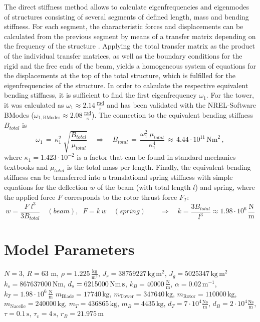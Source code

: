 \documentclass[a4paper]{article}
\newcommand{\rads}{\frac{\text{rad}}{\text{s}}}
\begin{document}
The direct stiffness method allows to calculate eigenfrequencies and eigenmodes of structures consisting of several segments of defined length, mass and bending stiffness. For each segment, the characteristic forces and displacements can be calculated from the previous segment by means of a transfer matrix depending on the frequency of the structure \cite{GaschKnothe2}. Applying the total transfer matrix as the product of the individual transfer matrices, as well as the boundary conditions for the rigid and the free ends of the beam, yields a homogeneous system of equations for the displacements at the top of the total structure, which is fulfilled for the eigenfrequencies of the structure.
In order to calculate the respective equivalent bending stiffness, it is sufficient to find the first eigenfrequency $\omega_1$. For the tower, it was calculated as $\omega_1 \approx 2.14 \, \rads$ and has been validated with the NREL-Software BModes \cite{BModes} ($\omega_{1,\text{BModes}} \approx 2.08 \, \rads $). The connection to the equivalent bending stiffness $B_{total}$ is
\begin{equation}
\omega_1 \, = \, \kappa_1^2 \; \sqrt{\frac{B_{total}}{\mu_{total}}} \quad \Rightarrow \quad B_{total} \,
			= \, \frac{\omega_1^2 \;  \mu_{total}}{\kappa_1^4} \, \approx \, 4.44 \cdot 10^{11} \, \text{Nm}^2 \, ,
\label{gl:B_total}
\end{equation}
where $\kappa_1 = 1.423 \cdot 10^{-2}$ is a factor that can be found in standard mechanics textbooks and $\mu_{total}$ is the total mass per length.
Finally, the equivalent bending stiffness can be transferred into a translational spring stiffness with simple equations for the deflection $w$ of the beam (with total length $l$) and spring, where the applied force $F$ corresponds to the rotor thrust force $F_T$:
\begin{equation}
w=\frac{F\;l^3}{3 B_{total}} \quad (beam), \; \; F=k \, w \quad (spring) \qquad \Rightarrow \quad k=\frac{3B_{total}}{l^3} \approx 1.98 \cdot 10^6 \, \frac{\text{N}}{\text{m}}
\end{equation}


\section{\label{Sec_AppModelParameters}Model Parameters}

$N = 3$, $R = 63$ m, $\rho = 1.225 \, \frac{\text{kg}}{\text{m}^3}$, $J_r = 38759227 \, \text{kg}\,\text{m}^2$,
$J_g = 5025347 \, \text{kg}\,\text{m}^2$
\newline $k_s = 867637000 \, \text{Nm}$, $d_s = 6215000 \, \text{Nm\,s}$, $k_B = 40000 \, \frac{\text{N}}{\text{m}}$, $\alpha = 0.02 \, \text{m}^{-1}$, 
$k_T = 1.98 \cdot 10^6 \, \frac{\text{N}}{\text{m}}$
\newline $m_\text{Blade} = 17740 \, \text{kg}$, $m_\text{Tower} = 347640 \, \text{kg}$, $m_\text{Rotor} = 110000 \, \text{kg}$, $m_\text{Nacelle} = 240000 \, \text{kg}$,
\newline $m_T = 436865 \,\text{kg}$, $m_B = 4435 \,\text{kg}$, $d_T = 7 \cdot 10^4 \frac{\text{Ns}}{\text{m}}$, $d_B = 2 \cdot 10^4 \frac{\text{Ns}}{\text{m}}$,
$\tau = 0.1 \,\text{s}$, $\tau_v = 4 \,\text{s}$, $r_B = 21.975 \,\text{m}$
\end{document}
